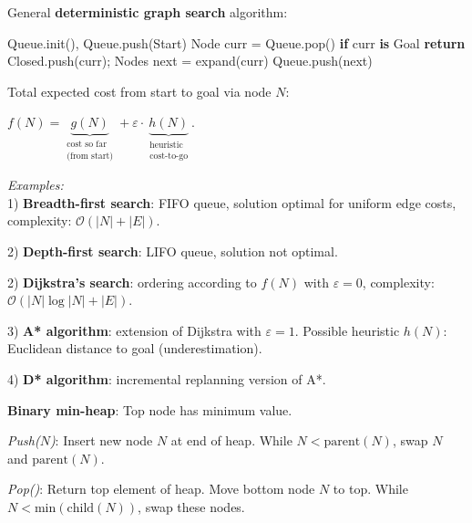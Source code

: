 \documentclass[landscape]{article}
\newcommand{\vmspace}{\vspace{-7pt}}
\newcommand{\vamspace}{\vspace{-3pt}}
\newcommand{\vpspace}{\vspace{5pt}}
\begin{document}
\begin{multicols}{3}
\vpspace

\begin{minipage}{\columnwidth}
  General \textbf{deterministic graph search} algorithm:

  \vamspace

  \begin{algorithm}[H]
    \DontPrintSemicolon
    Queue.init(),
    Queue.push(Start)\;
    {
      Node curr = Queue.pop()\;
      \textbf{if} curr \textbf{is} Goal \textbf{return}\;
      Closed.push(curr);
      Nodes next = expand(curr)\;
      {
        Queue.push(next)\;
      }
    }
  \end{algorithm}
\end{minipage}

\begin{minipage}{\columnwidth}
  Total expected cost from start to goal via node $N$:
  \vmspace
  \begin{center}
    $f(N) = \underbrace{g(N)}_{\substack{\text{cost so far} \\
    \text{(from start)}}}
    + \varepsilon\cdot\underbrace{h(N)}_{\substack{
    \text{heuristic} \\ \text{cost-to-go}
    }
    }.$
  \end{center}
\end{minipage}

\vmspace

\begin{minipage}{\columnwidth}
  \textit{Examples:}\\
  1) \textbf{Breadth-first search}: FIFO queue, solution optimal for uniform
  edge costs, complexity: $\mathcal O (|N| + |E|)$.

  2) \textbf{Depth-first search}: LIFO queue, solution not optimal.

  2) \textbf{Dijkstra's search}: ordering according to $f(N)$ with $\varepsilon
  = 0$, complexity: $\mathcal O (|N|\log |N| + |E|)$.

  3) \textbf{A* algorithm}: extension of Dijkstra with $\varepsilon=1$. Possible
  heuristic $h(N)$: Euclidean distance to goal (underestimation).

  4) \textbf{D* algorithm}: incremental replanning version of A*.
\end{minipage}

\vpspace

\begin{minipage}{\columnwidth}
  \textbf{Binary min-heap}: Top node has minimum value.
  \begin{compactitem}
  \item \textit{Push($N$)}: Insert new node $N$ at end of heap. While $N <
    \mathrm{parent}(N)$, swap $N$ and $\mathrm{parent}(N)$.
  \item \textit{Pop()}: Return top element of heap. Move bottom node $N$ to top.
    While $N < \mathrm{min}(\mathrm{child}(N))$, swap these nodes.
  \end{compactitem}
\end{minipage}


\end{multicols}
\end{document}
